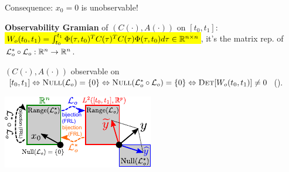\begin{Fact}
Consequence: $x_0=0$ is unobservable!
\end{Fact}
\begin{Definition}
\textbf{Observability Gramian} of $(C(\cdot),A(\cdot))$ on $[t_0,t_1]$: \hl{$W_o(t_0,t_1)=\int_{t_0}^{t_1}\Phi(\tau,t_0)^TC(\tau)^TC(\tau)\Phi(\tau,t_0)d\tau\in\mathbb R^{n\times n}$}, it's the matrix rep. of $\mathcal L_o^*\circ\mathcal L_o:\mathbb R^n\to\mathbb R^n$.
\end{Definition}
\begin{Theorem}
$(C(\cdot),A(\cdot))$ observable on $[t_0,t_1]\Leftrightarrow\textsc{Null}(\mathcal L_o)=\{0\}\Leftrightarrow\textsc{Null}(\mathcal L_o^*\circ\mathcal L_o)=\{0\}\Leftrightarrow\textsc{Det}[W_o(t_0,t_1)]\ne 0$ ().
\end{Theorem}
\begin{minipage}{0.2\columnwidth}
\begin{turn}{90}
\includegraphics[height=1\columnwidth]{figures/lin_space_decomposition_observability.pdf}
\end{turn}
\end{minipage}%
